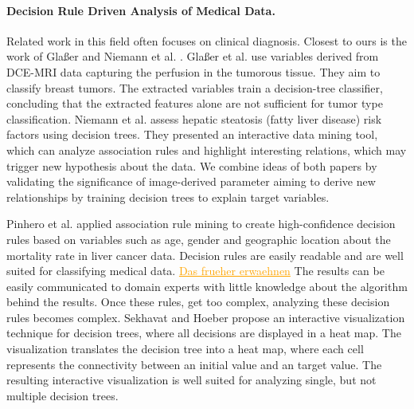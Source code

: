 \documentclass[a4paper,twoside]{style/article}
\newcommand{\com}[1]{\textcolor{orange}{\uline{#1}}}
\begin{document}
\paragraph{Decision Rule Driven Analysis of Medical Data.}
Related work in this field often focuses on clinical diagnosis.
Closest to ours is the work of Gla{\ss}er \cite{Glasser2013} and Niemann et al. \cite{Niemann2014}.
Gla{\ss}er et al. \cite{Glasser2013} use variables derived from DCE-MRI data capturing the perfusion in the tumorous tissue.
They aim to classify breast tumors.
The extracted variables train a decision-tree classifier, concluding that the extracted features alone are not sufficient for tumor type classification.
Niemann et al. \cite{Niemann2014} assess hepatic steatosis (fatty liver disease) risk factors using decision trees.
They presented an interactive data mining tool, which can analyze association rules and highlight interesting relations, which may trigger new hypothesis about the data.
We combine ideas of both papers by validating the significance of image-derived parameter aiming to derive new relationships by training decision trees to explain target variables.

Pinhero et al. \cite{Pinheiro} applied association rule mining to create high-confidence decision rules based on variables such as age, gender and geographic location about the mortality rate in liver cancer data.
Decision rules are easily readable and are well suited for classifying medical data. \com{Das frueher erwaehnen}
The results can be easily communicated to domain experts with little knowledge about the algorithm behind the results.
Once these rules, get too complex, analyzing these decision rules becomes complex.
Sekhavat and Hoeber \cite{Sekhavat} propose an interactive visualization technique for decision trees, where all decisions are displayed in a heat map.
The visualization translates the decision tree into a heat map, where each cell represents the connectivity between an initial value and an target value.
The resulting interactive visualization is well suited for analyzing single, but not multiple decision trees.
\end{document}
